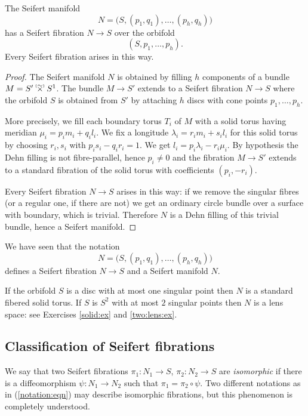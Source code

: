 \begin{prop} 
The Seifert manifold
\begin{equation*} 
N = \big(S, (p_1,q_1), \ldots, (p_h, q_h)\big)
\end{equation*}
has a Seifert fibration $N \to S$ over the orbifold 
$$(S, p_1,\ldots, p_h).$$
Every Seifert fibration arises in this way.
\end{prop}
\begin{proof}
The Seifert manifold $N$ is obtained by filling $h$ components of a bundle $M=S'\timforsetil S^1$. The bundle $M \to S'$ extends to a Seifert fibration $N \to S$ where the orbifold $S$ is obtained from $S'$ by attaching $h$ discs with cone points $p_1,\ldots, p_h$.

More precisely, we fill each boundary torus $T_i$ of $M$ with a solid torus having meridian $\mu_i= p_im_i + q_il_i$. We fix a longitude $\lambda_i= r_im_i + s_il_i$ for this solid torus by choosing $r_i,s_i$ with $p_is_i-q_ir_i=1$. We get $l_i = p_i\lambda_i - r_i\mu_i$. By hypothesis the Dehn filling is not fibre-parallel, hence $p_i\neq 0$ and the fibration $M\to S'$ extends to a standard fibration of the solid torus with coefficients $(p_i,-r_i)$.

Every Seifert fibration $N\to S$ arises in this way: if we remove the singular fibres (or a regular one, if there are not) we get an ordinary circle bundle over a surface with boundary, which is trivial. Therefore $N$ is a Dehn filling of this trivial bundle, hence a Seifert manifold.
\end{proof}

We have seen that the notation
\begin{equation} \label{notation:eqn}
N = \big(S, (p_1,q_1), \ldots, (p_h, q_h)\big)
\end{equation}
defines a Seifert fibration $N \to S$ and a Seifert manifold $N$.

\begin{example} \label{bad:example}
If the orbifold $S$ is a disc with at most one singular point then $N$ is a standard fibered solid torus. If $S$ is $S^2$ with at most $2$ singular points then $N$ is a lens space: see Exercises \ref{solid:ex} and \ref{two:lens:ex}.
\end{example}

\subsection{Classification of Seifert fibrations}
We say that two Seifert fibrations $\pi_1\colon N_1\to S$, $\pi_2\colon N_2 \to S$ are \emph{isomorphic} if there is a diffeomorphism $\psi\colon N_1 \to N_2$ such that $\pi_1 = \pi_2\circ \psi$. Two different notations as in (\ref{notation:eqn}) may describe isomorphic fibrations, but this phenomenon is completely understood.

